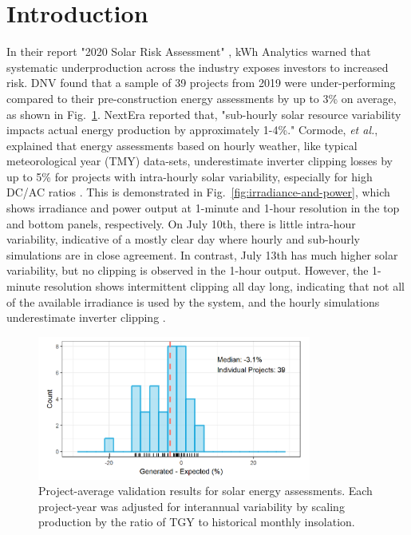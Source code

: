 \documentclass[conference]{IEEEtran}
\begin{document}
\section{Introduction}
In their report "2020 Solar Risk Assessment" \cite{Matsui2020}, kWh Analytics warned that systematic underproduction across the industry exposes investors to increased risk. DNV found that a sample of 39 projects from 2019 were under-performing compared to their pre-construction energy assessments by up to 3\% on average, as shown in Fig.~\ref{fig:project-underperformance}. NextEra reported that, "sub-hourly solar resource variability impacts actual energy production by approximately 1-4\%." Cormode, \textit{et al.}, explained that energy assessments based on hourly weather, like typical meteorological year (TMY) data-sets, underestimate inverter clipping losses by up to 5\% for projects with intra-hourly solar variability, especially for high DC/AC ratios \cite{Cormode2019}. This is demonstrated in Fig.~\ref{fig:irradiance-and-power}, which shows irradiance and power output at 1-minute and 1-hour resolution in the top and bottom panels, respectively. On July 10th, there is little intra-hour variability, indicative of a mostly clear day where hourly and sub-hourly simulations are in close agreement. In contrast, July 13th has much higher solar variability, but no clipping is observed in the 1-hour output. However, the 1-minute resolution shows intermittent clipping all day long, indicating that not all of the available irradiance is used by the system, and the hourly simulations underestimate inverter clipping \cite{Kharait}.

\begin{figure}[htbp]
\centerline{\includegraphics[width=9cm]{fig1.png}}
\caption{Project-average validation results for solar energy assessments. Each project-year was adjusted for interannual variability by scaling production by the ratio of TGY to historical monthly insolation.}
\label{fig:project-underperformance}
\end{figure}
\end{document}
